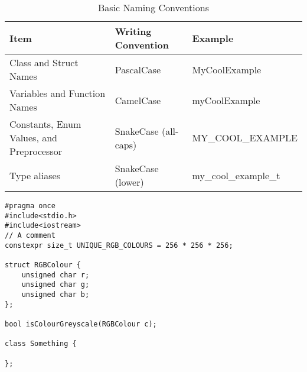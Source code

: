 \documentclass{article}
\begin{document}
\begin{table}[!ht]
	\begin{center}
		\caption{Basic Naming Conventions}
	\begin{tabular}{|l|l|l|}
		\hline
		\bf Item & \bf Writing Convention & \bf Example \\
		\hline
		Class and Struct Names                   & PascalCase           & MyCoolExample \\
		Variables and Function Names             & CamelCase            & myCoolExample \\
		Constants, Enum Values, and Preprocessor & SnakeCase (all-caps) & MY\_COOL\_EXAMPLE \\
		Type aliases                             & SnakeCase (lower)    & my\_cool\_example\_t \\
		\hline
	\end{tabular}
	\end{center}
\end{table}

\begin{lstlisting}
#pragma once
#include<stdio.h>
#include<iostream>
// A comment
constexpr size_t UNIQUE_RGB_COLOURS = 256 * 256 * 256;

struct RGBColour {
	unsigned char r;
	unsigned char g;
	unsigned char b;
};

bool isColourGreyscale(RGBColour c);

class Something {

};
\end{lstlisting}

\end{document}
